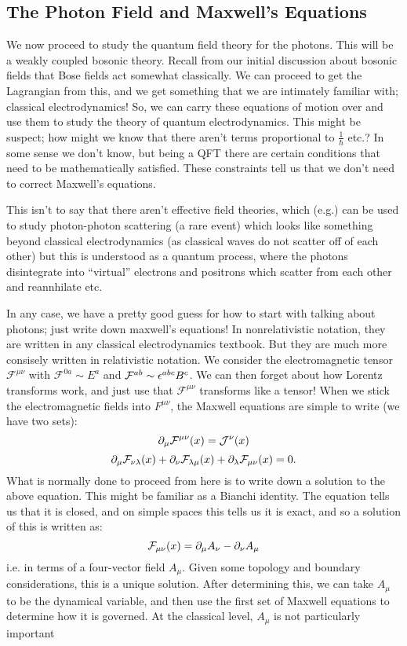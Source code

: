 \subsection{The Photon Field and Maxwell's Equations}
We now proceed to study the quantum field theory for the photons. This will be a weakly coupled bosonic theory. Recall from our initial discussion about bosonic fields that Bose fields act somewhat classically. We can proceed to get the Lagrangian from this, and we get something that we are intimately familiar with; classical electrodynamics! So, we can carry these equations of motion over and use them to study the theory of quantum electrodynamics. This might be suspect; how might we know that there aren't terms proportional to $\frac{1}{\hbar}$ etc.? In some sense we don't know, but being a QFT there are certain conditions that need to be mathematically satisfied. These constraints tell us that we don't need to correct Maxwell's equations.

This isn't to say that there aren't effective field theories, which (e.g.) can be used to study photon-photon scattering (a rare event) which looks like something beyond classical electrodynamics (as classical waves do not scatter off of each other) but this is understood as a quantum process, where the photons disintegrate into ``virtual'' electrons and positrons which scatter from each other and reannhilate etc.

In any case, we have a pretty good guess for how to start with talking about photons; just write down maxwell's equations! In nonrelativistic notation, they are written in any classical electrodynamics textbook. But they are much more consisely written in relativistic notation. We consider the electromagnetic tensor $\mathcal{F}^{\mu\nu}$ with $\mathcal{F}^{0a} \sim E^a$ and $\mathcal{F}^{ab} \sim \epsilon^{abc}B^c$. We can then forget about how Lorentz transforms work, and just use that $\mathcal{F}^{\mu\nu}$ transforms like a tensor! When we stick the electromagnetic fields into $F^{\mu\nu}$, the Maxwell equations are simple to write (we have two sets):
\begin{equation}
    \partial_\mu \mathcal{F}^{\mu\nu}(x) = \mathcal{J}^\nu(x)
\end{equation}
\begin{equation}
    \partial_\mu \mathcal{F}_{\nu\lambda}(x) + \partial_\nu \mathcal{F}_{\lambda \mu}(x) + \partial_\lambda \mathcal{F}_{\mu\nu}(x) = 0.
\end{equation}
What is normally done to proceed from here is to write down a solution to the above equation. This might be familiar as a Bianchi identity. The equation tells us that it is closed, and on simple spaces this tells us it is exact, and so a solution of this is written as:
\begin{equation}
    \mathcal{F}_{\mu\nu}(x) = \partial_\mu A_\nu - \partial_\nu A_\mu
\end{equation}
i.e. in terms of a four-vector field $A_\mu$. Given some topology and boundary considerations, this is a unique solution. After determining this, we can take $A_\mu$ to be the dynamical variable, and then use the first set of Maxwell equations to determine how it is governed. At the classical level, $A_\mu$ is not particularly important 